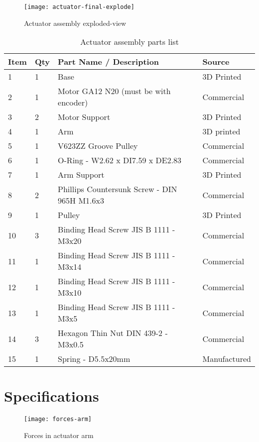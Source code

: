 \begin{figure}
    \centering
    \texttt{[image: actuator-final-explode]}
    \caption{Actuator assembly exploded-view}
    \label{fig:final-actuator-explode}
\end{figure}
\begin{table}[h]
    \centering
    \caption{Actuator assembly parts list}
    \label{tab:final-actuator-parts}
    \begin{tabular}{llll}
    \toprule
    Item & Qty & Part Name / Description & Source \\
    \midrule
    1 & 1 & Base & 3D Printed \\
    2 & 1 & Motor GA12 N20 (must be with encoder) & Commercial \\
    3 & 2 & Motor Support & 3D Printed \\
    4 & 1 & Arm & 3D printed \\
    5 & 1 & V623ZZ Groove Pulley & Commercial \\
    6 & 1 & O-Ring - W2.62 x DI7.59 x DE2.83 & Commercial \\
    7 & 1 & Arm Support & 3D Printed \\
    8 & 2 & Phillips Countersunk Screw - DIN 965H M1.6x3 & Commercial \\
    9 & 1 & Pulley & 3D Printed \\
    10 & 3 & Binding Head Screw JIS B 1111 - M3x20 & Commercial \\
    11 & 1 & Binding Head Screw JIS B 1111 - M3x14 & Commercial \\
    12 & 1 & Binding Head Screw JIS B 1111 - M3x10 & Commercial \\
    13 & 1 & Binding Head Screw JIS B 1111 - M3x5 & Commercial \\
    14 & 3 & Hexagon Thin Nut DIN 439-2 - M3x0.5 & Commercial \\
    15 & 1 & Spring - D5.5x20mm & Manufactured \\
    \bottomrule
    \end{tabular}
\end{table}


\section{Specifications}

\begin{figure}
    \centering
    \texttt{[image: forces-arm]}
    \caption{Forces in actuator arm}
    \label{fig:forces-arm}
\end{figure}


